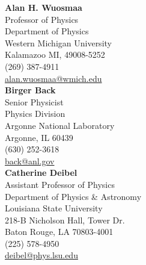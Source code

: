 \vspace{2.0\baselineskip}%

\textbf{Alan H. Wuosmaa}\\
Professor of Physics\\
Department of Physics\\
Western Michigan University\\
Kalamazoo MI, 49008-5252\\
(269) 387-4911\\
\href{mailto:alan.wuosmaa@wmich.edu}{alan.wuosmaa@wmich.edu}\\

\textbf{Birger Back}\\
Senior Physicist\\
Physics Division\\
Argonne National Laboratory\\
Argonne, IL 60439\\
(630) 252-3618\\
\href{mailto:back@anl.gov}{back@anl.gov}\\

\textbf{Catherine Deibel}\\
Assistant Professor of Physics\\
Department of Physics \& Astronomy\\
Louisiana State University\\
218-B Nicholson Hall, Tower Dr.\\
Baton Rouge, LA 70803-4001\\
(225) 578-4950\\
\href{mailto:deibel@phys.lsu.edu}{deibel@phys.lsu.edu}

